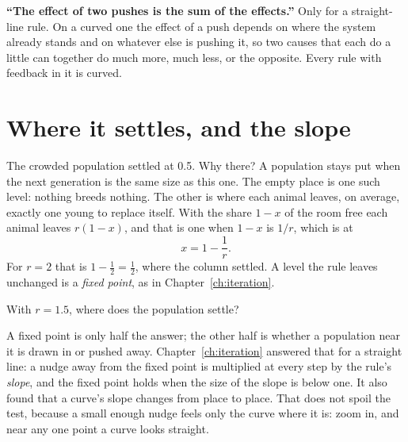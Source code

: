 \begin{trapbox}
\textbf{\enquote{The effect of two pushes is the sum of the effects.}} Only
for a straight-line rule. On a curved one the effect of a push depends on
where the system already stands and on whatever else is pushing it, so two
causes that each do a little can together do much more, much less, or the
opposite. Every rule with feedback in it is curved.
\end{trapbox}

\section{Where it settles, and the slope}
\label{sec:ch03-slope}

\noindent
The crowded population settled at \num{0.5}. Why there? A population stays
put when the next generation is the same size as this one. The empty place
is one such level: nothing breeds nothing. The other is where each animal
leaves, on average, exactly one young to replace itself. With the share
$1 - x$ of the room free each animal leaves $r(1 - x)$, and that is one when
$1 - x$ is $1/r$, which is at
\[ x = 1 - \frac{1}{r}. \]
For $r = 2$ that is $1 - \tfrac{1}{2} = \tfrac{1}{2}$, where the column
settled. A level the rule leaves unchanged is a \emph{fixed point}, as in
Chapter~\ref{ch:iteration}.

\begin{think}
With $r = \num{1.5}$, where does the population settle?
\end{think}
A fixed point is only half the answer; the other half is whether a
population near it is drawn in or pushed away. Chapter~\ref{ch:iteration}
answered that for a straight line: a nudge away from the fixed point is
multiplied at every step by the rule's \emph{slope}, and the fixed point
holds when the size of the slope is below one. It also found that a curve's
slope changes from place to place. That does not spoil the test, because a
small enough nudge feels only the curve where it is: zoom in, and near any
one point a curve looks straight.


